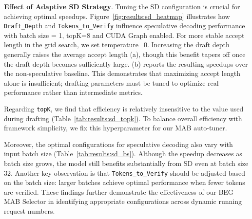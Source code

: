\documentclass[sigplan,screen]{acmart}
\begin{document}
\noindent\textbf{Effect of Adaptive SD Strategy}.
Tuning the SD configuration is crucial for achieving optimal speedups. Figure~\ref{fig:results:sd_heatmap} illustrates how \texttt{Draft\_Depth} and \texttt{Tokens\_to\_Verify} influence speculative decoding performance with batch size = 1, topK=8 and CUDA Graph enabled. For more stable accept length in the grid search, we set temperature=0. Increasing the draft depth generally raises the average accept length (a), though this benefit tapers off once the draft depth becomes sufficiently large. (b) reports the resulting speedups over the non-speculative baseline. This demonstrates that maximizing accept length alone is insufficient; drafting parameters must be tuned to optimize real performance rather than intermediate metrics.

Regarding \texttt{topK}, we find that efficiency is relatively insensitive to the value used during drafting (Table~\ref{tab:results:sd_topk}). To balance overall efficiency with framework simplicity, we fix this hyperparameter for our MAB auto-tuner.


\begin{table}[t]
\centering
\caption{\textbf{Effect of topK for speculative decoding.} Results are benchmarked using Qwen-32B on
H100 GPUs (TP=4), with \texttt{Draft\_Depth}=12 and \texttt{Tokens\_to\_Verify}=64.}

%
\label{tab:results:sd_topk}
%
\end{table} 

Moreover, the optimal configurations for speculative decoding also vary with input batch size (Table~\ref{tab:results:sd_bs}). Although the speedup decreases as batch size grows, the model still benefits substantially from SD even at batch size 32. Another key observation is that \texttt{Tokens\_to\_Verify} should be adjusted based on the batch size: larger batches achieve optimal performance when fewer tokens are verified. These findings further demonstrate the effectiveness of our BEG MAB Selector in identifying appropriate configurations across dynamic running request numbers.
\end{document}
